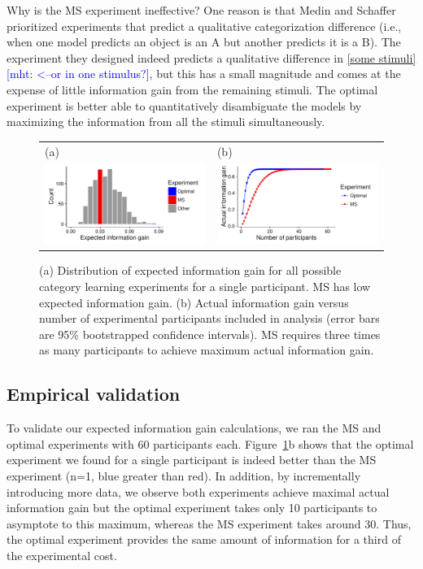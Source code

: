 \documentclass{article}
\newcommand{\mht}[1]{\textcolor{Blue}{[mht: #1]}}
\begin{document}
Why is the MS experiment ineffective?
One reason is that Medin and Schaffer prioritized experiments that predict a qualitative categorization difference (i.e., when one model predicts an object is an A  but another predicts it is a B).
The experiment they designed indeed predicts a qualitative difference in \ref{some stimuli} \mht{<--or in one stimulus?}, but this has a small magnitude and comes at the expense of little information gain from the remaining stimuli.
The optimal experiment is better able to quantitatively disambiguate the models by maximizing the information from all the stimuli simultaneously.

\begin{figure}[t]
\centering
\begin{tabular}{l l}
(a) & (b)\\
\includegraphics[width=2.5in]{img/category-eig-dist.pdf} & \includegraphics[width=2.5in]{img/category-aig-curve.pdf}\\
\end{tabular}
\caption{(a) Distribution of expected information gain for all possible category learning experiments for a single participant. MS has low expected information gain. (b) Actual information gain versus number of experimental participants included in analysis (error bars are 95\% bootstrapped confidence intervals). MS requires three times as many participants to achieve maximum actual information gain.}
\label{fig:dist}
\end{figure}

\subsection{Empirical validation}

To validate our expected information gain calculations, we ran the MS and optimal experiments with 60 participants each.
Figure~\ref{fig:dist}b shows that the optimal experiment we found for a single participant is indeed better than the MS experiment (n=1, blue greater than red).
In addition, by incrementally introducing more data, we observe both experiments achieve maximal actual information gain but the optimal experiment takes only 10 participants to asymptote to this maximum, whereas the MS experiment takes around 30.
Thus, the optimal experiment provides the same amount of information for a third of the experimental cost.
\end{document}
